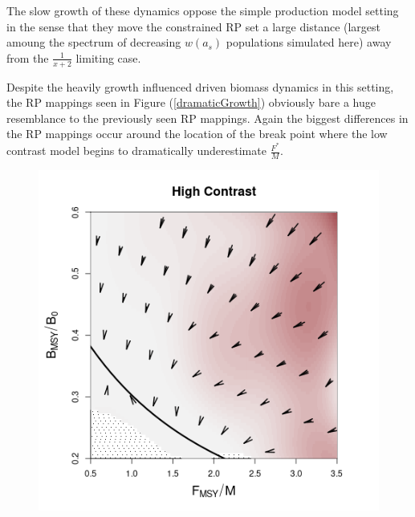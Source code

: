 %
The slow growth of these dynamics oppose the simple production model setting
in the sense that they move the constrained RP set a large distance (largest
amoung the spectrum of decreasing $w(a_s)$ populations simulated here)
away from the $\frac{1}{x+2}$ limiting case. 

%
Despite the heavily growth influenced driven biomass dynamics in this setting, 
the RP mappings seen in Figure (\ref{dramaticGrowth}) obviously bare a huge 
resemblance to the previously seen RP mappings. Again the biggest differences 
in the RP mappings occur around the location of the break point where the low 
contrast model begins to dramatically underestimate $\frac{F^*}{M}$.
\begin{figure}[h!]
\begin{minipage}[h!]{0.44\textwidth}
\includegraphics[width=\textwidth]{../ddBias/directionalBiasDDSubExpT45N150A0-1AS2K0.1Reds 2.png}
\end{minipage}
\begin{minipage}[h!]{0.44\textwidth}

\end{minipage}
\end{figure}
